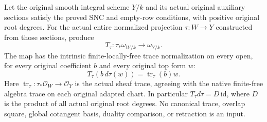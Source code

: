 \begin{theorem}
\label{thm:kn-global-trace-original-adapted-cover}
\notready
Let the original smooth integral scheme $Y/k$ and its actual original
auxiliary sections satisfy the proved SNC and empty-row conditions,
with positive original root degrees.  For the actual entire normalized
projection $\tau:W\to Y$ constructed from those sections, produce
\[
 T_\tau:\tau_*\omega_{W/k}\longrightarrow\omega_{Y/k}.
\]
The map has the intrinsic finite-locally-free trace normalization on every
open, for every original coefficient $b$ and every original top form $w$:
\[
 T_\tau(b\,d\tau(w))=\operatorname{tr}_\tau(b)w.
\]
Here $\operatorname{tr}_\tau:\tau_*\mathcal O_W\to\mathcal O_Y$ is the
actual sheaf trace, agreeing with the native finite-free algebra trace
on each original adapted chart.  In particular
$T_\tau d\tau=D\,\mathrm{id}$, where $D$ is the product of all actual
original root degrees.  No canonical trace, overlap square, global
cotangent basis, duality comparison, or retraction is an input.
\end{theorem}
